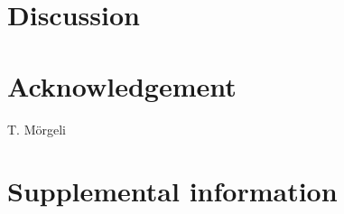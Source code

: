 \documentclass[preprint,3p, 11pt,authoryear]{elsarticle}
\begin{document}
{\section{Discussion}



\clearpage

\section*{Acknowledgement}
T. M\"orgeli
 

 



\section*{Supplemental information}


}
\end{document}

